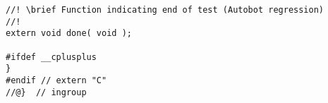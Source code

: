 \begin{lstlisting}[caption=\raggedright{mcu-libs/RLS.h}, frame=single]
//! \brief Function indicating end of test (Autobot regression)
//!
extern void done( void );

#ifdef __cplusplus
}
#endif // extern "C"
//@}  // ingroup

\end{lstlisting}